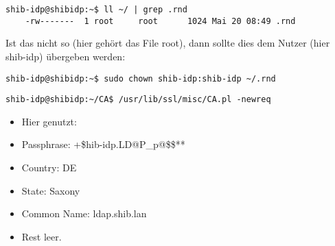 \begin{lstlisting}
shib-idp@shibidp:~$ ll ~/ | grep .rnd
	-rw-------  1 root     root      1024 Mai 20 08:49 .rnd
\end{lstlisting}			
Ist das nicht so (hier gehört das File root), dann sollte dies dem Nutzer (hier
shib-idp) übergeben werden:
\begin{lstlisting}
shib-idp@shibidp:~$ sudo chown shib-idp:shib-idp ~/.rnd
\end{lstlisting}		
\begin{lstlisting}
shib-idp@shibidp:~/CA$ /usr/lib/ssl/misc/CA.pl -newreq
\end{lstlisting}	
\begin{itemize}
\item Hier genutzt:
\item Passphrase: +\$hib-idp.LD@P\_p@\$\$**
\item Country: DE
\item State: Saxony
\item Common Name: ldap.shib.lan
\item Rest leer.
\end{itemize}

